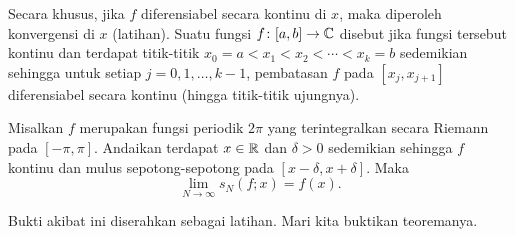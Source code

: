 Secara khusus,
jika $f$ diferensiabel secara
kontinu di $x$,
maka diperoleh konvergensi di $x$ (latihan).
Suatu fungsi $f \colon [a,b] \to {\mathbb{C}}$ disebut
\emph{}
jika fungsi tersebut kontinu dan terdapat titik-titik
$x_0 = a < x_1 < x_2 < \cdots < x_k = b$
sedemikian sehingga untuk setiap $j=0,1,\ldots,k-1$, pembatasan $f$ pada $[x_j,x_{j+1}]$
diferensiabel secara kontinu (hingga titik-titik ujungnya).

\begin{cor} \label{cor:fourierpiecewisesmooth}
Misalkan $f$ merupakan fungsi periodik $2\pi$
yang terintegralkan secara Riemann pada $[-\pi,\pi]$.  Andaikan
terdapat $x\in {\mathbb{R}}$ dan $\delta > 0$ sedemikian sehingga $f$ kontinu dan mulus
sepotong-sepotong pada $[x-\delta,x+\delta]$. Maka
\begin{equation*}
\lim_{N \to \infty} s_N(f;x) = f(x) .
\end{equation*}
\end{cor}

Bukti akibat ini diserahkan sebagai latihan.  Mari kita buktikan
teoremanya.

